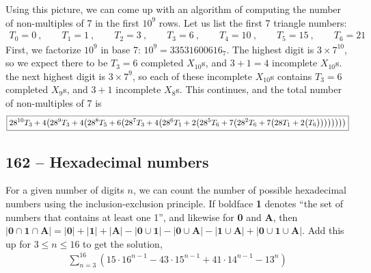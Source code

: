 \documentclass{article}
\begin{document}
Using this picture, we can come up with an algorithm of computing the number of non-multiples of 7 in the first $10^9$ rows.
Let us list the first 7 triangle numbers:
\begin{align*}
	T_0 = 0~, \qquad T_1 = 1~, \qquad T_2 = 3 ~, \qquad T_3 = 6 ~,\qquad T_4 = 10 ~,\qquad T_5 = 15 ~, \qquad T_6 = 21
\end{align*}
First, we factorize $10^9$ in base 7: $10^9 = 33531600616_7$.
The highest digit is $3 \times 7^{10}$, so we expect there to be $T_3 = 6$ completed $X_{10}$s, and $3+1 = 4$ incomplete $X_{10}$s.
the next highest digit is $3 \times 7^9$, so each of these incomplete $X_{10}$s contains $T_3 = 6$ completed $X_9$s, and $3+1$ incomplete $X_8$s.
This continues, and the total number of non-multiples of 7 is
\begin{align*}
	\boxed{ 28^{10} T_3 + 4 \qty( 28^9 T_3 + 4 \qty( 28^8 T_5 + 6 \qty( 28^7 T_3 + 4 \qty( 28^6 T_1 + 2 \qty( 28^5 T_6 + 7 \qty( 28^2 T_6 + 7 \qty\big( 28 T_1 + 2 \qty\big( T_6 )))))))) } 
\end{align*}


\subsection*{162 -- Hexadecimal numbers} 
For a given number of digits $n$, we can count the number of possible hexadecimal numbers using the inclusion-exclusion principle. 
If boldface \textbf{1} denotes ``the set of numbers that contains at least one 1'', and likewise for \textbf{0} and \textbf{A}, then $|\mathbf{0} \cap \mathbf{1} \cap \mathbf{A}| = |\mathbf{0}| + |\mathbf{1}| + |\mathbf{A}| - |\mathbf{0} \cup \mathbf{1}| - |\mathbf{0} \cup \mathbf{A}| - |\mathbf{1} \cup \mathbf{A}| + |\mathbf{0} \cup \mathbf{1} \cup \mathbf{A}|$.
Add this up for $3 \leq n \leq 16$ to get the solution, 
\begin{align*}
	\boxed{ \sum_{n=3}^{16} \left(15 \cdot 16^{n-1} - 43 \cdot 15^{n-1} + 41 \cdot 14^{n-1} - 13^n\right) } 
\end{align*}
\end{document}
